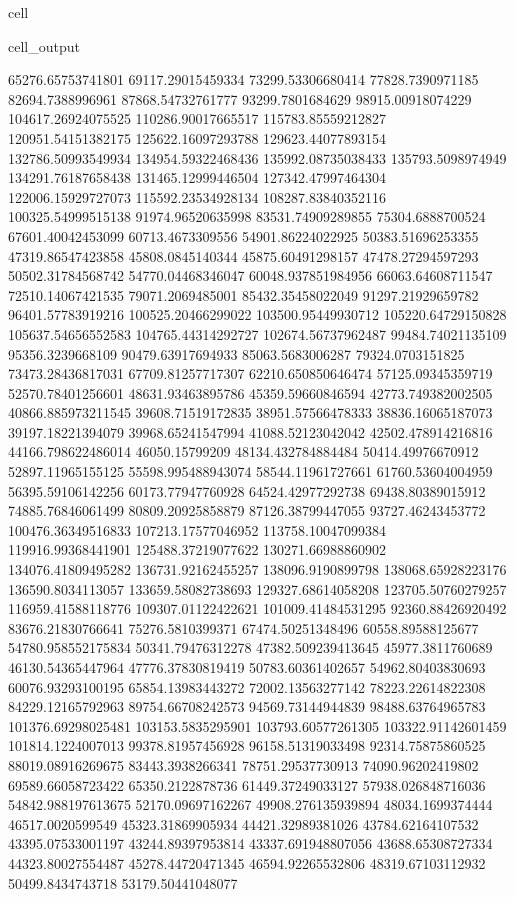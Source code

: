 \documentclass[letterpaper,10pt,english]{jupyterBook}
\begin{document}
\begin{sphinxuseclass}{cell}
\begin{sphinxVerbatimOutput}
\begin{sphinxuseclass}{cell_output}
\begin{sphinxVerbatim}[commandchars=\\\{\}]
65276.65753741801  69117.29015459334  73299.53306680414  77828.7390971185  82694.7388996961  87868.54732761777  93299.7801684629  98915.00918074229  104617.26924075525  110286.90017665517  115783.85559212827  120951.54151382175  125622.16097293788  129623.44077893154  132786.50993549934  134954.59322468436  135992.08735038433  135793.5098974949  134291.76187658438  131465.12999446504  127342.47997464304  122006.15929727073  115592.23534928134  108287.83840352116  100325.54999515138  91974.96520635998  83531.74909289855  75304.6888700524  67601.40042453099  60713.4673309556  54901.86224022925  50383.51696253355  47319.86547423858  45808.0845140344  45875.60491298157  47478.27294597293  50502.31784568742  54770.04468346047  60048.937851984956  66063.64608711547  72510.14067421535  79071.2069485001  85432.35458022049  91297.21929659782  96401.57783919216  100525.20466299022  103500.95449930712  105220.64729150828  105637.54656552583  104765.44314292727  102674.56737962487  99484.74021135109  95356.3239668109  90479.63917694933  85063.5683006287  79324.0703151825  73473.28436817031  67709.81257717307  62210.650850646474  57125.09345359719  52570.78401256601  48631.93463895786  45359.59660846594  42773.749382002505  40866.885973211545  39608.71519172835  38951.57566478333  38836.16065187073  39197.18221394079  39968.65241547994  41088.52123042042  42502.478914216816  44166.798622486014  46050.15799209  48134.432784884484  50414.49976670912  52897.11965155125  55598.995488943074  58544.11961727661  61760.53604004959  
56395.59106142256  60173.77947760928  64524.42977292738  69438.80389015912  74885.76846061499  80809.20925858879  87126.38799447055  93727.46243453772  100476.36349516833  107213.17577046952  113758.10047099384  119916.99368441901  125488.37219077622  130271.66988860902  134076.41809495282  136731.92162455257  138096.9190899798  138068.65928223176  136590.8034113057  133659.58082738693  129327.68614058208  123705.50760279257  116959.41588118776  109307.01122422621  101009.41484531295  92360.88426920492  83676.21830766641  75276.5810399371  67474.50251348496  60558.89588125677  54780.958552175834  50341.79476312278  47382.509239413645  45977.3811760689  46130.54365447964  47776.37830819419  50783.60361402657  54962.80403830693  60076.93293100195  65854.13983443272  72002.13563277142  78223.22614822308  84229.12165792963  89754.66708242573  94569.73144944839  98488.63764965783  101376.69298025481  103153.5835295901  103793.60577261305  103322.91142601459  101814.1224007013  99378.81957456928  96158.51319033498  92314.75875860525  88019.08916269675  83443.3938266341  78751.29537730913  74090.96202419802  69589.66058723422  65350.2122878736  61449.37249033127  57938.026848716036  54842.988197613675  52170.09697162267  49908.276135939894  48034.1699374444  46517.0020599549  45323.31869905934  44421.32989381026  43784.62164107532  43395.07533001197  43244.89397953814  43337.691948807056  43688.65308727334  44323.80027554487  45278.44720471345  46594.92265532806  48319.67103112932  50499.8434743718  53179.50441048077  

\end{sphinxVerbatim}
\end{sphinxuseclass}
\end{sphinxVerbatimOutput}
\end{sphinxuseclass}
\end{document}
